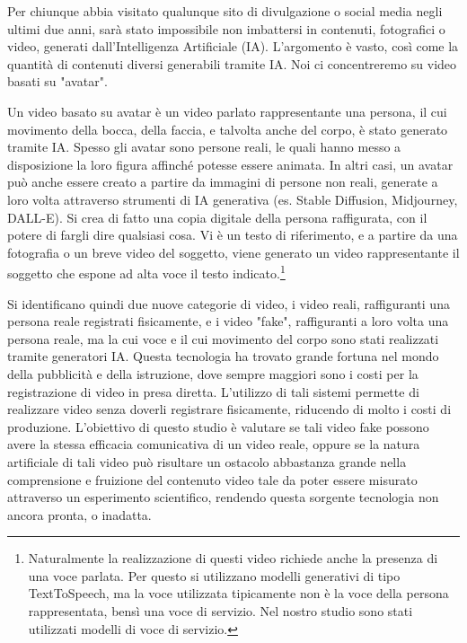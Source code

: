
Per chiunque abbia visitato qualunque sito di divulgazione o social media negli ultimi due anni, sarà stato impossibile non imbattersi in contenuti, fotografici o video, generati dall'Intelligenza Artificiale (IA). L'argomento è vasto, così come la quantità di contenuti diversi generabili tramite IA. Noi ci concentreremo su video basati su "avatar".

Un video basato su avatar è un video parlato rappresentante una persona, il cui movimento della bocca, della faccia, e talvolta anche del corpo, è stato generato tramite IA. Spesso gli avatar sono persone reali, le quali hanno messo a disposizione la loro figura affinché potesse essere animata. In altri casi, un avatar può anche essere creato a partire da immagini di persone non reali, generate a loro volta attraverso strumenti di IA generativa (es. Stable Diffusion, Midjourney, DALL-E). Si crea di fatto una copia digitale della persona raffigurata, con il potere di fargli dire qualsiasi cosa. Vi è un testo di riferimento, e a partire da una fotografia o un breve video del soggetto, viene generato un video rappresentante il soggetto che espone ad alta voce il testo indicato.\footnote{Naturalmente la realizzazione di questi video richiede anche la presenza di una voce parlata. Per questo si utilizzano modelli generativi di tipo TextToSpeech, ma la voce utilizzata tipicamente non è la voce della persona rappresentata, bensì una voce di servizio. Nel nostro studio sono stati utilizzati modelli di voce di servizio.}

Si identificano quindi due nuove categorie di video, i video reali, raffiguranti una persona reale registrati fisicamente, e i video "fake", raffiguranti a loro volta una persona reale, ma la cui voce e il cui movimento del corpo sono stati realizzati tramite generatori IA. Questa tecnologia ha trovato grande fortuna nel mondo della pubblicità e della istruzione, dove sempre maggiori sono i costi per la registrazione di video in presa diretta. L'utilizzo di tali sistemi permette di realizzare video senza doverli registrare fisicamente, riducendo di molto i costi di produzione. L'obiettivo di questo studio è valutare se tali video fake possono avere la stessa efficacia comunicativa di un video reale, oppure se la natura artificiale di tali video può risultare un ostacolo abbastanza grande nella comprensione e fruizione del contenuto video tale da poter essere misurato attraverso un esperimento scientifico, rendendo questa sorgente tecnologia non ancora pronta, o inadatta. 

